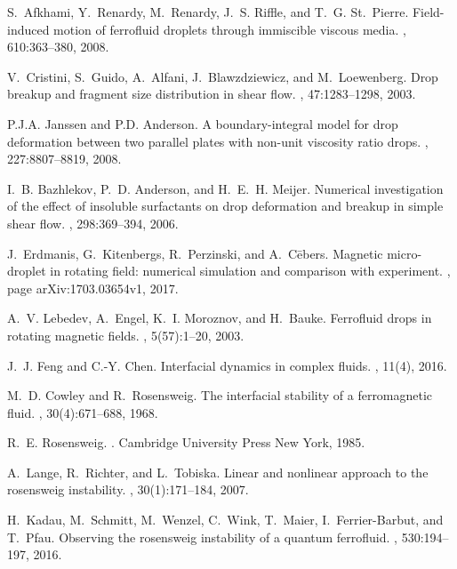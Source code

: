 \begin{thebibliography}{10}
S.~Afkhami, Y.~Renardy, M.~Renardy, J.~S. Riffle, and T.~G. {St.~Pierre}.
\newblock Field-induced motion of ferrofluid droplets through immiscible
  viscous media.
, 610:363--380, 2008.

V.~Cristini, S.~Guido, A.~Alfani, J.~Blawzdziewicz, and M.~Loewenberg.
\newblock Drop breakup and fragment size distribution in shear flow.
, 47:1283--1298, 2003.

P.J.A. Janssen and P.D. Anderson.
\newblock A boundary-integral model for drop deformation between two parallel
  plates with non-unit viscosity ratio drops.
, 227:8807--8819, 2008.

I.~B. Bazhlekov, P.~D. Anderson, and H.~E.~H. Meijer.
\newblock Numerical investigation of the effect of insoluble surfactants on
  drop deformation and breakup in simple shear flow.
, 298:369--394, 2006.

J.~Erdmanis, G.~Kitenbergs, R.~Perzinski, and A.~C\={e}bers.
\newblock Magnetic micro-droplet in rotating field: numerical simulation and
  comparison with experiment.
, page arXiv:1703.03654v1, 2017.

A.~V. Lebedev, A.~Engel, K.~I. Moroznov, and H.~Bauke.
\newblock Ferrofluid drops in rotating magnetic fields.
, 5(57):1--20, 2003.

J.~J. Feng and C.-Y. Chen.
\newblock Interfacial dynamics in complex fluids.
, 11(4), 2016.

M.~D. Cowley and R.~Rosensweig.
\newblock The interfacial stability of a ferromagnetic fluid.
, 30(4):671--688, 1968.

R.~E. Rosensweig.
.
\newblock Cambridge University Press New York, 1985.

A.~Lange, R.~Richter, and L.~Tobiska.
\newblock Linear and nonlinear approach to the rosensweig instability.
, 30(1):171--184, 2007.

H.~Kadau, M.~Schmitt, M.~Wenzel, C.~Wink, T.~Maier, I.~Ferrier-Barbut, and
  T.~Pfau.
\newblock Observing the rosensweig instability of a quantum ferrofluid.
, 530:194--197, 2016.


\end{thebibliography}
